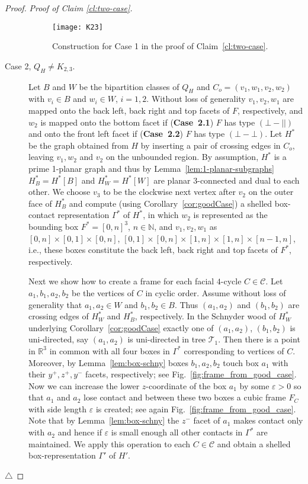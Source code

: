 \documentclass{article}
\newenvironment{claimproof}[1]{\noindent \textit{Proof of Claim #1.}}
{
\hfill $\triangle$\medskip
}
\newcommand{\TT}{{\mathcal{T}}}
\newcommand{\pperp}{\ensuremath{(\bot{-}\bot)}}
\newcommand{\ppar}{\ensuremath{(\bot{-}||)}}
\begin{document}
\begin{proof}
\begin{claimproof}{\ref{cl:two-case}}
\begin{description}
    \begin{figure}[htb]
     \centering
     \texttt{[image: K23]}
     \caption{Construction for Case 1 in the proof of Claim~\ref{cl:two-case}.}
     \label{fig:K23}
    \end{figure}

    \item[Case 2, $Q_H \neq K_{2,3}$.]
     Let $B$ and $W$ be the bipartition classes of $Q_H$ and $C_{o} = (v_1,w_1,v_2,w_2)$ with $v_i \in B$ and $w_i \in W$, $i=1,2$.
     Without loss of generality $v_1,v_2,w_1$ are mapped onto the back left, back right and top facets of $F$, respectively, and $w_2$ is mapped onto the bottom facet if (\textbf{Case~2.1}) $F$ has type $\ppar$ and onto the front left facet if (\textbf{Case~2.2}) $F$ has type $\pperp$.
     Let $H^*$ be the graph obtained from $H$ by inserting a pair of crossing edges in $C_{o}$, leaving $v_1,w_2$ and $v_2$ on the unbounded region.
     By assumption, $H^*$ is a prime 1-planar graph and thus by Lemma~\ref{lem:1-planar-subgraphs} $H^*_B = H^*[B]$ and $H^*_W = H^*[W]$ are planar $3$-connected and dual to each other.
     We choose $v_3$ to be the clockwise next vertex after $v_2$ on the outer face of $H^*_B$ and compute (using Corollary~\ref{cor:goodCase}) a shelled box-contact representation $\Gamma^*$ of $H^*$, in which $w_2$ is represented as the bounding box $F^* = [0,n]^3$, $n \in \mathbb{N}$, and $v_1,v_2,w_1$ as $[0,n]\times[0,1]\times[0,n]$, $[0,1]\times[0,n]\times[1,n]\times[1,n]\times[n-1,n]$, i.e., these boxes constitute the back left, back right and top facets of $F^*$, respectively.

     Next we show how to create a frame for each facial $4$-cycle $C \in \mathcal{C}$.
     Let $a_1,b_1,a_2,b_2$ be the vertices of $C$ in cyclic order.
     Assume without loss of generality that $a_1,a_2 \in W$ and $b_1,b_2 \in B$.
     Thus $(a_1,a_2)$ and $(b_1,b_2)$ are crossing edges of $H^*_W$ and $H^*_B$, respectively.
     In the Schnyder wood of $H^*_W$ underlying Corollary~\ref{cor:goodCase} exactly one of $(a_1,a_2)$, $(b_1,b_2)$ is uni-directed, say $(a_1,a_2)$ is uni-directed in tree $\TT_1$.
     Then there is a point in $\mathbb{R}^3$ in common with all four boxes in $\Gamma^*$ corresponding to vertices of $C$.
     Moreover, by Lemma~\ref{lem:box-schny} boxes $b_1, a_2, b_2$ touch box $a_1$ with their $y^+,z^+,y^-$ facets, respectively; see Fig.~\ref{fig:frame_from_good_case}.
     Now we can increase the lower $z$-coordinate of the box $a_1$ by some $\varepsilon > 0$ so that $a_1$ and $a_2$ lose contact and between these two boxes a cubic frame $F_C$ with side length $\varepsilon$ is created; see again Fig.~\ref{fig:frame_from_good_case}.
     Note that by Lemma~\ref{lem:box-schny} the $z^-$ facet of $a_1$ makes contact only with $a_2$ and hence if $\varepsilon$ is small enough all other contacts in $\Gamma^*$ are maintained.
     We apply this operation to each $C \in \mathcal{C}$ and obtain a shelled box-representation $\Gamma'$ of $H'$.


\end{description}
\end{claimproof}
\end{proof}
\end{document}
